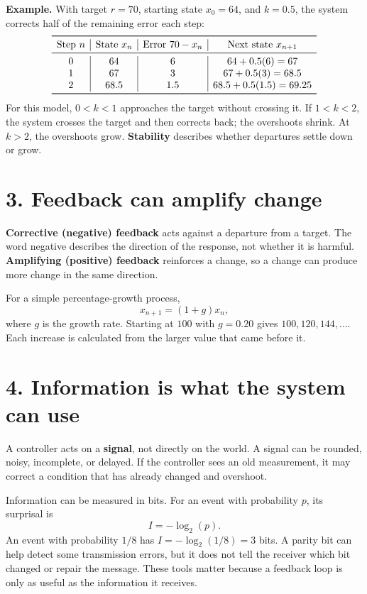 \documentclass[12pt]{article}
\begin{document}
\textbf{Example.} With target $r=70$, starting state $x_0=64$, and $k=0.5$, the system corrects half of the remaining error each step:
\[
\begin{array}{c|c|c|c}
\toprule
\text{Step }n & \text{State }x_n & \text{Error }70-x_n & \text{Next state }x_{n+1}\\
\midrule
0&64&6&64+0.5(6)=67\\
1&67&3&67+0.5(3)=68.5\\
2&68.5&1.5&68.5+0.5(1.5)=69.25\\
\bottomrule
\end{array}
\]
For this model, $0<k<1$ approaches the target without crossing it. If $1<k<2$, the system crosses the target and then corrects back; the overshoots shrink. At $k>2$, the overshoots grow. \textbf{Stability} describes whether departures settle down or grow.

\section*{3. Feedback can amplify change}
\textbf{Corrective (negative) feedback} acts against a departure from a target. The word negative describes the direction of the response, not whether it is harmful. \textbf{Amplifying (positive) feedback} reinforces a change, so a change can produce more change in the same direction.

For a simple percentage-growth process,
\[
x_{n+1}=(1+g)x_n,
\]
where $g$ is the growth rate. Starting at $100$ with $g=0.20$ gives $100,120,144,\ldots$. Each increase is calculated from the larger value that came before it.

\section*{4. Information is what the system can use}
A controller acts on a \textbf{signal}, not directly on the world. A signal can be rounded, noisy, incomplete, or delayed. If the controller sees an old measurement, it may correct a condition that has already changed and overshoot.

Information can be measured in bits. For an event with probability $p$, its surprisal is
\[
I=-\log_2(p).
\]
An event with probability $1/8$ has $I=-\log_2(1/8)=3$ bits. A parity bit can help detect some transmission errors, but it does not tell the receiver which bit changed or repair the message. These tools matter because a feedback loop is only as useful as the information it receives.
\end{document}

